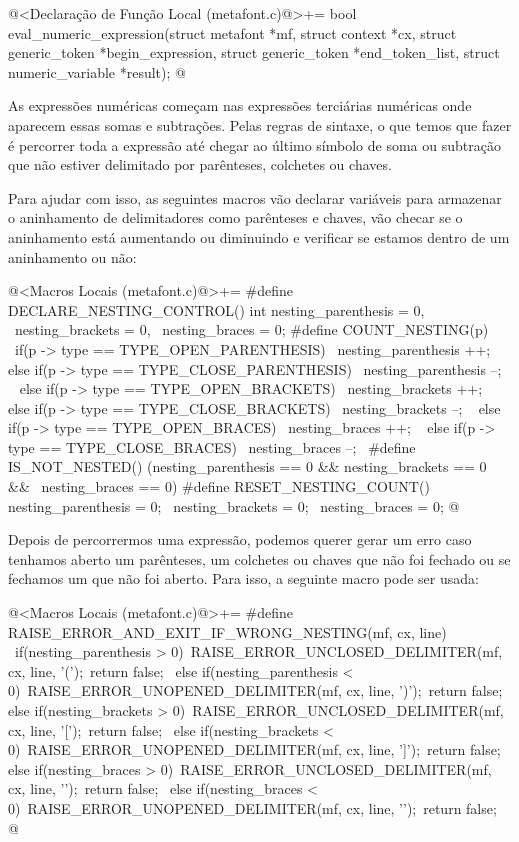 \iniciocodigo
@<Declaração de Função Local (metafont.c)@>+=
bool eval_numeric_expression(struct metafont *mf, struct context *cx,
                             struct generic_token *begin_expression,
                             struct generic_token *end_token_list,
                             struct numeric_variable *result);
@
\fimcodigo

As expressões numéricas começam nas expressões terciárias numéricas
onde aparecem essas somas e subtrações. Pelas regras de sintaxe, o que
temos que fazer é percorrer toda a expressão até chegar ao último
símbolo de soma ou subtração que não estiver delimitado por
parênteses, colchetes ou chaves.

Para ajudar com isso, as seguintes macros vão declarar variáveis para
armazenar o aninhamento de delimitadores como parênteses e chaves, vão
checar se o aninhamento está aumentando ou diminuindo e verificar se
estamos dentro de um aninhamento ou não:

\iniciocodigo
@<Macros Locais (metafont.c)@>+=
#define DECLARE_NESTING_CONTROL() int nesting_parenthesis = 0, \
                                      nesting_brackets = 0, \
                                      nesting_braces = 0;
#define COUNT_NESTING(p) \
  {if(p -> type == TYPE_OPEN_PARENTHESIS){         \
    nesting_parenthesis ++;                       \
  } else if(p -> type == TYPE_CLOSE_PARENTHESIS){ \
    nesting_parenthesis --;                       \
  } else if(p -> type == TYPE_OPEN_BRACKETS){     \
    nesting_brackets ++;                          \
  } else if(p -> type == TYPE_CLOSE_BRACKETS){    \
    nesting_brackets --;                          \
  } else if(p -> type == TYPE_OPEN_BRACES){       \
    nesting_braces ++;                            \
  } else if(p -> type == TYPE_CLOSE_BRACES){      \
    nesting_braces --;\
  }}
#define IS_NOT_NESTED() (nesting_parenthesis == 0 && nesting_brackets == 0 && \
                         nesting_braces == 0)
#define RESET_NESTING_COUNT() nesting_parenthesis = 0; \
                              nesting_brackets = 0; \
                              nesting_braces = 0;
@
\fimcodigo

Depois de percorrermos uma expressão, podemos querer gerar um erro
caso tenhamos aberto um parênteses, um colchetes ou chaves que não foi
fechado ou se fechamos um que não foi aberto. Para isso, a seguinte
macro pode ser usada:

\iniciocodigo
@<Macros Locais (metafont.c)@>+=
#define RAISE_ERROR_AND_EXIT_IF_WRONG_NESTING(mf, cx, line) {\
  if(nesting_parenthesis > 0){\
    RAISE_ERROR_UNCLOSED_DELIMITER(mf, cx, line, '(');\
    return false;\
  } else if(nesting_parenthesis < 0){\
    RAISE_ERROR_UNOPENED_DELIMITER(mf, cx, line, ')');\
    return false;\
  } else if(nesting_brackets > 0){\
    RAISE_ERROR_UNCLOSED_DELIMITER(mf, cx, line, '[');\
    return false;\
  } else if(nesting_brackets < 0){\
    RAISE_ERROR_UNOPENED_DELIMITER(mf, cx, line, ']');\
    return false;\
  } else if(nesting_braces > 0){\
    RAISE_ERROR_UNCLOSED_DELIMITER(mf, cx, line, '{');\
    return false;\
  } else if(nesting_braces < 0){\
    RAISE_ERROR_UNOPENED_DELIMITER(mf, cx, line, '}');\
    return false;}}
@
\fimcodigo

